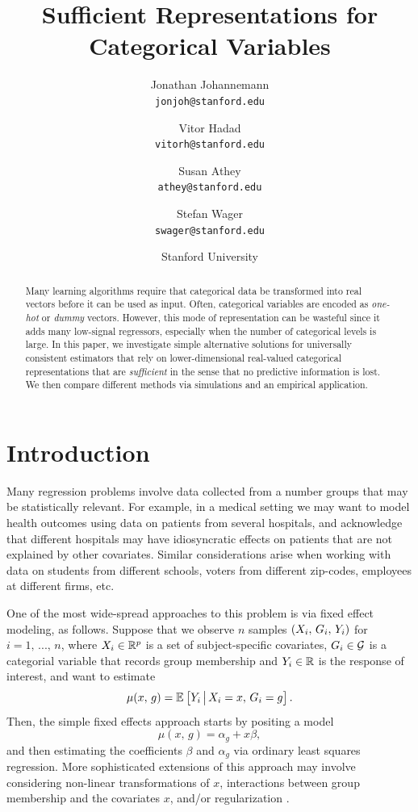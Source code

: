 \documentclass{article}
\author{Jonathan Johannemann \\ \texttt{jonjoh@stanford.edu}
\and Vitor Hadad \\ \texttt{vitorh@stanford.edu}
\and Susan Athey \\ \texttt{athey@stanford.edu}
\and Stefan Wager \\ \texttt{swager@stanford.edu}}
\date{Stanford University}
\title{Sufficient Representations for Categorical Variables}
\theoremstyle{plain}
\theoremstyle{definition}
\theoremstyle{remark}
\begin{document}
\maketitle

\begin{abstract}
    \noindent Many learning algorithms require that categorical data be transformed into real vectors before it can be used as input. Often, categorical variables are encoded as \emph{one-hot} or \emph{dummy} vectors. However, this mode of representation can be wasteful since it adds many low-signal regressors, especially when the number of categorical levels is large.  In this paper, we investigate simple alternative solutions for universally consistent estimators that rely on lower-dimensional real-valued categorical representations that are \emph{sufficient} in the sense that no predictive information is lost. We then compare different methods via simulations and an empirical application.
\end{abstract}


\section{Introduction}

Many regression problems involve data collected from a number groups that may be statistically relevant.
For example, in a medical setting we may want to model health outcomes using data on patients from
several hospitals, and acknowledge that different hospitals may have idiosyncratic effects on patients
that are not explained by other covariates. Similar considerations arise when working with data on
students from different schools, voters from different zip-codes, employees at different firms, etc.

One of the most wide-spread approaches to this problem is via fixed effect modeling,
as follows. Suppose that we observe $n$ samples $\left(X_i, \, G_i, \, Y_i\right)$
for $i = 1, \, ..., \, n$, where $X_i \in \mathbb{R}^p$ is a set of subject-specific covariates, $G_i \in \mathcal{G}$ is a categorial variable that
records group membership and $Y_i \in \mathbb{R}$ is the response of interest, and want to estimate
\begin{equation}
\label{eq:mu}
\mu(x, \, g) = \mathbb{E}_{}\left[Y_i \,\big|\, X_i = x, \, G_i = g\right].
\end{equation}
Then, the simple fixed effects approach starts by positing a model
\begin{equation}
\label{eq:FE}
\mu(x, \, g) = \alpha_g + x\beta,
\end{equation}
and then estimating the coefficients $\beta$ and $\alpha_g$ via ordinary least squares regression.
More sophisticated extensions of this approach may involve considering non-linear transformations
of $x$, interactions between group membership and the covariates $x$, and/or regularization
\citep{angrist2008mostly,diggle2002analysis,wooldridge2010econometric}.
\end{document}
